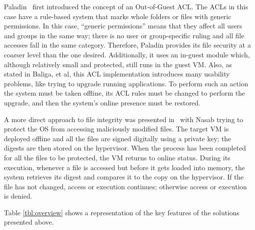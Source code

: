 \par Paladin~\cite{baliga2008automated} first introduced the concept of an Out-of-Guest \ac{ACL}. The \acp{ACL} in this case have a rule-based system that marks whole folders or files with generic permissions. In this case, ``generic permissions'' means that they affect all users and groups in the same way; there is no user or group-specific ruling and all file accesses fall in the same category. Therefore, Paladin provides its file security at a coarser level than the one desired. Additionally, it uses an in-guest module which, although relatively small and protected, still runs in the guest \ac{VM}. Also, as stated in Baliga, et al\cite{baliga2008automated}, this \ac{ACL} implementation introduces many usability problems, like trying to upgrade running applications. To perform such an action the system must be taken offline, its \ac{ACL} rules must be changed to perform the upgrade, and then the system's online presence must be restored. 

\par A more direct approach to file integrity was presented in~\cite{nasab2012security} with Nasab trying to protect the \ac{OS} from accessing maliciously modified files. The target \ac{VM} is deployed offline and all the files are signed digitally using a private key; the digests are then stored on the hypervisor. When the process has been completed for all the files to be protected, the \ac{VM} returns to online status. During its execution, whenever a file is accessed but before it gets loaded into memory, the system retrieves its digest and compares it to the copy on the hypervisor. If the file has not changed, access or execution continues; otherwise access or execution is denied.

\par Table \ref{tbl:overview} shows a representation of the key features of the solutions presented above.

